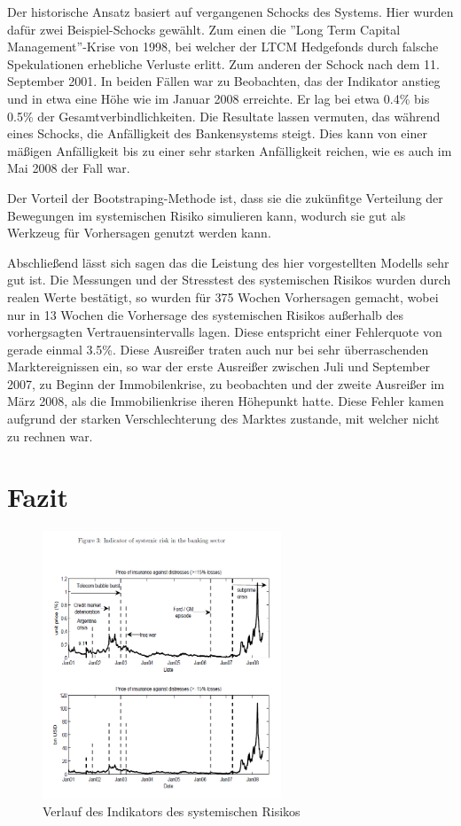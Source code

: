 \documentclass[a4paper,12pt]{scrartcl}
\begin{document}
Der historische Ansatz basiert auf vergangenen Schocks des Systems. Hier wurden dafür zwei Beispiel-Schocks gewählt. Zum einen die ''Long Term Capital Management''-Krise von 1998, bei welcher der LTCM Hedgefonds durch falsche Spekulationen erhebliche Verluste erlitt. Zum anderen der Schock nach dem 11. September 2001.
In beiden Fällen war zu Beobachten, das der Indikator anstieg und in etwa eine Höhe wie im Januar 2008 erreichte. Er lag bei etwa 0.4\% bis 0.5\% der Gesamtverbindlichkeiten.
Die Resultate lassen vermuten, das während eines Schocks, die Anfälligkeit des Bankensystems steigt. Dies kann von einer mäßigen Anfälligkeit bis zu einer sehr starken Anfälligkeit reichen, wie es auch im Mai 2008 der Fall war. 

Der Vorteil der Bootstraping-Methode ist, dass sie die zukünfitge Verteilung der Bewegungen im systemischen Risiko simulieren kann, wodurch sie gut als Werkzeug für Vorhersagen genutzt werden kann. 


Abschließend lässt sich sagen das die Leistung des hier vorgestellten Modells sehr gut ist. Die Messungen und der Stresstest des systemischen Risikos wurden durch realen Werte bestätigt, so wurden für 375 Wochen Vorhersagen gemacht, wobei nur in 13 Wochen die Vorhersage des systemischen Risikos außerhalb des vorhergsagten Vertrauensintervalls lagen. Diese entspricht einer Fehlerquote von gerade einmal 3.5\%.
Diese Ausreißer traten auch nur bei sehr überraschenden Marktereignissen ein, so war der erste Ausreißer zwischen Juli und September 2007, zu Beginn der Immobilenkrise, zu beobachten und der zweite Ausreißer im März 2008, als die Immobilienkrise iheren Höhepunkt hatte. Diese Fehler kamen aufgrund der starken Verschlechterung des Marktes zustande, mit welcher nicht zu rechnen war.

\section{Fazit}



\begin{figure}[htb]
	\centering
		\includegraphics[height=8cm]{Pictures/Figure3.png}
		\caption{Verlauf des Indikators des systemischen Risikos}
\end{figure}
\end{document}
